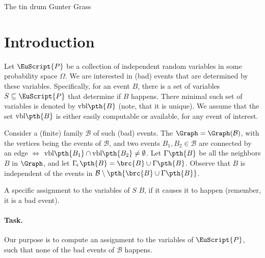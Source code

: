 \makeatletter
{}
\makeatother
\ifx\bookMode\undefined%
\fi
{}

\ChapterPrefix{}
\ChapterGen{}



\SaveIndent%
%
{The tin drum}%
{Gunter Grass}


\section{Introduction} 

\newcommand{\Vars}{\EuScript{P}}%
\newcommand{\BEvent}{{B}}%
\newcommand{\BEventA}{{C}}%
\newcommand{\BEventSet}{\mathcal{B}}%
\newcommand{\SetVars}{S}%
\newcommand{\vblX}[1]{\mathrm{v{b}l}\pth{#1}}%
\newcommand{\NbrX}[1]{\Gamma\pth{#1}}%
\newcommand{\NbrCX}[1]{\Gamma_{\!\!+}\pth{#1}}%

Let $\Vars$ be a collection of independent random variables in some
probability space $\Omega$. We are interested in (bad) events that are
determined by these variables. Specifically, for an event $\BEvent$,
there is a set of variables $\SetVars \subseteq \Vars$ that determine
if $\BEvent$ happens. There minimal such set of variables is denoted
by $\vblX{\BEvent}$ (note, that it is unique). We assume that the set
$\vblX{\BEvent}$ is either easily computable or available, for any
event of interest.

Consider a (finite) family $\BEventSet$ of such (bad) events. The
 $\Graph = \Graph(\BEventSet)$, with the
vertices being the events of $\BEventSet$, and two events
$\BEvent_1,\BEvent_2 \in \BEventSet$ are connected by an edge $\iff$
$\vblX{\BEvent_1} \cap \vblX{\BEvent_2} \neq \emptyset$. Let
$\NbrX{\BEvent}$ be all the neighbors $\BEvent$ in $\Graph$, and let
$\NbrCX{\BEvent} = \brc{\BEvent} \cup \NbrX{\BEvent}$. Observe that
$\BEvent$ is independent of the events in
$\BEventSet \setminus \pth{\brc{ \BEvent } \cup \NbrX{\BEvent}}$.

A specific assignment to the variables of
$\SetVars$  $\BEvent$, if it causes it to happen
(remember, it is a bad event). 

\paragraph*{Task.}
Our purpose is to compute an assignment to the variables of $\Vars$,
such that none of the bad events of $\BEventSet$ happens.

